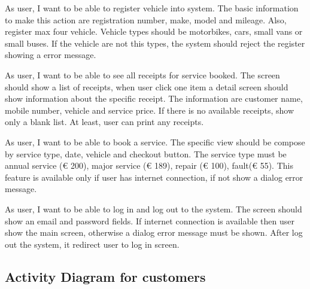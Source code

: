 \begin{description}[font=$\bullet$~\normalfont\scshape\color{red!50!black}]

\item [Register vehicle] As user, I want to be able to register vehicle into system. The  basic information to make this action are registration number, make, model and mileage. Also, register max four vehicle. Vehicle types should be motorbikes, cars, small vans or small buses. If the vehicle are not this types, the system should reject the register showing a error message.

\item [View receipts]As user, I want to be able to see all receipts for service booked. The screen should show a list of receipts, when user click  one item a detail screen should show information about the specific receipt. The information are customer name, mobile number, vehicle and service price. If there is no available receipts, show only a blank list. At least, user can print any receipts.

\item [Book service] As user, I want to be able to book a service. The specific view should be compose by service type, date, vehicle and checkout button. The service  type must be annual service (€ 200), major service (€ 189), repair (€ 100), fault(€ 55). This feature is available only if user has internet connection, if not show a dialog error message.

\item [Log in] As user, I want to be able to log in and log out to the system. The screen should  show an email and password fields. If internet connection is available then user show the main screen, otherwise a dialog error message must be shown. After log out the system, it redirect user to log in screen.
\end{description}
\newpage
\subsection{Activity Diagram for customers}

